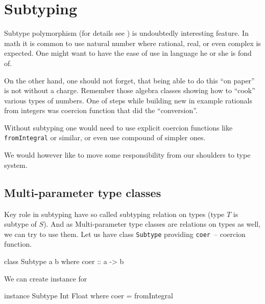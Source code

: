 \documentclass[11pt,oneside,draft]{fithesis2}
\newcommand\uv[1]{``#1''}
\theoremstyle{definition}
\begin{document}
%

\section{Subtyping}

Subtype polymorphism (for details see \cite{pierce:2002:types})
is undoubtedly interesting feature. In math it is common to use
natural number where rational, real, or even complex is expected.
%
One might want to have the ease of use in language
he or she is fond of.

On the other hand, one should not forget, that being
able to do this \uv{on paper} is not without a charge.
Remember those algebra classes showing how to \uv{cook}
various types of numbers. One of steps while building
new in example rationals from integers was
coercion function that did the \uv{conversion}.

Without subtyping one would need to use explicit
coercion functions like \texttt{fromIntegral} or
similar, or even use compound of simpler ones.

We would however like to move some responsibility
from our shoulders to type system.

\subsection{Multi-parameter type classes}

Key role in subtyping have so called subtyping relation
on types (type \(T\) is subtype of \(S\)).
And as Multi-parameter type classes are relations on types as well,
we can try to use them. Let us have class \texttt{Subtype} providing
\texttt{coer}~-- coercion function.

\begin{code}
class Subtype a b where
    coer :: a -> b
\end{code}

We can create instance for

\begin{code}
instance Subtype Int Float where
    coer = fromIntegral
\end{code}
\end{document}
